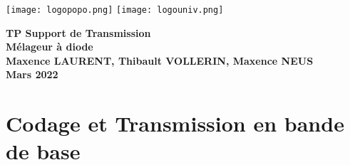\documentclass[oneside,a4paper,12pt]{article}
\begin{document}
	\begin{titlepage}
		\texttt{[image: logopopo.png]}
		\hspace*{\fill}
		\texttt{[image: logouniv.png]}
		
		\begin{center}
			\vspace{1cm}
			\textbf{TP Support de Transmission}\\
			\textbf{Mélageur à diode}\\
			\vspace{1cm}
			\textbf{Maxence LAURENT, Thibault VOLLERIN, Maxence NEUS}\\
			\vspace{3cm}
			\vspace{\fill}
			\textbf{Mars 2022}\\
		\end{center}
	\end{titlepage}
	
	\tableofcontents
	
	\vspace{5cm}

	\newpage

	\section{Codage et Transmission en bande de base}

	\subsection{}
\end{document}
